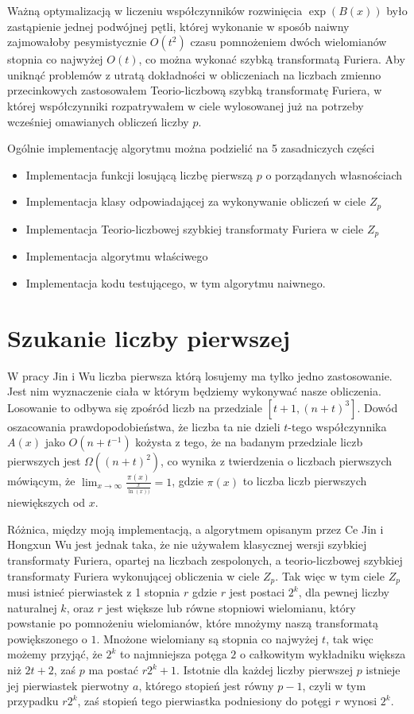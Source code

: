 \documentclass{article}
\begin{document}
Ważną optymalizacją w liczeniu współczynników rozwinięcia $\exp(B(x))$ było zastąpienie jednej podwójnej pętli, której wykonanie w sposób naiwny zajmowałoby pesymistycznie $O(t^2)$ czasu pomnożeniem dwóch wielomianów stopnia co najwyżej $O(t)$, co można wykonać szybką 
transformatą Furiera. Aby uniknąć problemów z utratą dokładności w obliczeniach na liczbach 
zmienno przecinkowych zastosowałem Teorio-liczbową szybką transformatę Furiera, w której współczynniki rozpatrywałem w ciele wylosowanej już na potrzeby wcześniej omawianych obliczeń 
liczby $p$.

Ogólnie implementację algorytmu można podzielić na 5 zasadniczych części
\begin{itemize}
  \item Implementacja funkcji losującą liczbę pierwszą $p$ o porządanych własnościach
  \item Implementacja klasy odpowiadającej za wykonywanie obliczeń w ciele $Z_p$
  \item Implementacja Teorio-liczbowej szybkiej transformaty Furiera w ciele $Z_p$
  \item Implementacja algorytmu właściwego
  \item Implementacja kodu testującego, w tym algorytmu naiwnego.
\end{itemize}

\section{Szukanie liczby pierwszej}
W pracy Jin i Wu liczba pierwsza którą losujemy ma tylko jedno zastosowanie. Jest nim
wyznaczenie ciała w którym będziemy wykonywać nasze obliczenia. Losowanie to odbywa się 
zpośród liczb na przedziale $[t+1,(n+t)^3]$. Dowód oszacowania prawdopodobieństwa, 
że liczba ta nie dzieli $t$-tego współczynnika $A(x)$ jako $O(n+t^{-1})$ kożysta z tego, że
na badanym przedziale liczb pierwszych jest $\Omega((n+t)^2)$, co wynika z twierdzenia o 
liczbach pierwszych mówiącym, że $\lim_{x \to \infty} \frac{\pi(x)}{\frac{x}{\ln(x))}}=1$, gdzie $\pi(x)$ to liczba liczb pierwszych niewiększych od $x$.

Różnica, między moją implementacją, a algorytmem opisanym przez Ce Jin i Hongxun Wu jest 
jednak taka, że nie używałem klasycznej wersji szybkiej transformaty Furiera, opartej na
liczbach zespolonych, a teorio-liczbowej szybkiej transformaty Furiera wykonującej obliczenia
w ciele $Z_p$. Tak więc w tym ciele $Z_p$ musi istnieć pierwiastek z 1 stopnia $r$ gdzie
$r$ jest postaci $2^k$, dla pewnej liczby naturalnej $k$, oraz $r$ jest większe lub równe 
stopniowi wielomianu, który powstanie po pomnożeniu wielomianów, które mnożymy naszą 
transformatą powiększonego o $1$. Mnożone wielomiany są stopnia co najwyżej $t$, tak więc
możemy przyjąć, że $2^k$ to najmniejsza potęga $2$ o całkowitym wykładniku większa niż 
$2t+2$, zaś $p$ ma postać $r2^k+1$. Istotnie dla każdej liczby pierwszej $p$ istnieje jej pierwiastek pierwotny $a$,
którego stopień jest równy $p-1$, czyli w tym przypadku $r2^k$, zaś stopień tego pierwiastka podniesiony
do potęgi $r$ wynosi $2^k$.
\end{document}
